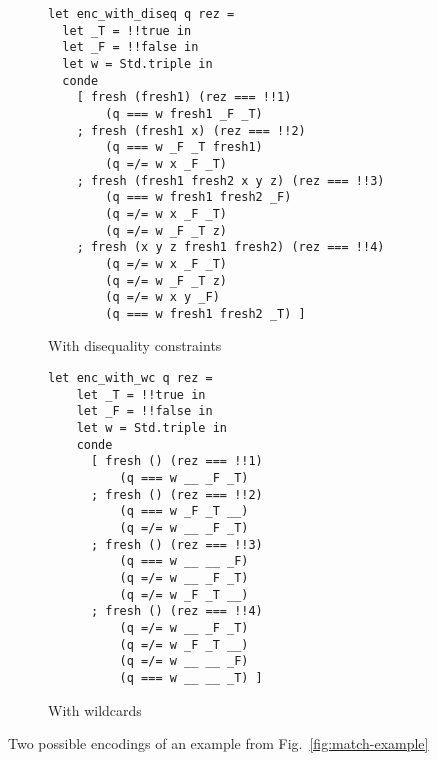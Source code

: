 \begin{figure*}[t]
\begin{subfigure}{0.49\textwidth}
\begin{lstlisting}
let enc_with_diseq q rez =
  let _T = !!true in
  let _F = !!false in
  let w = Std.triple in 
  conde
    [ fresh (fresh1) (rez === !!1) 
        (q === w fresh1 _F _T)
    ; fresh (fresh1 x) (rez === !!2) 
        (q === w _F _T fresh1) 
        (q =/= w x _F _T)
    ; fresh (fresh1 fresh2 x y z) (rez === !!3) 
        (q === w fresh1 fresh2 _F) 
        (q =/= w x _F _T) 
        (q =/= w _F _T z)
    ; fresh (x y z fresh1 fresh2) (rez === !!4)
        (q =/= w x _F _T)
        (q =/= w _F _T z)
        (q =/= w x y _F)
        (q === w fresh1 fresh2 _T) ]
\end{lstlisting}
\caption{With disequality constraints}
\label{fig:matching-example3}
\end{subfigure}
\begin{subfigure}{0.49\textwidth}
\begin{lstlisting}
let enc_with_wc q rez =
    let _T = !!true in
    let _F = !!false in
    let w = Std.triple in
    conde
      [ fresh () (rez === !!1) 
          (q === w __ _F _T)
      ; fresh () (rez === !!2) 
          (q === w _F _T __) 
          (q =/= w __ _F _T)
      ; fresh () (rez === !!3) 
          (q === w __ __ _F) 
          (q =/= w __ _F _T) 
          (q =/= w _F _T __)
      ; fresh () (rez === !!4)
          (q =/= w __ _F _T)
          (q =/= w _F _T __)
          (q =/= w __ __ _F)
          (q === w __ __ _T) ]
\end{lstlisting}
\caption{With wildcards}
\end{subfigure}
\caption{Two possible encodings of an example from Fig.~\ref{fig:match-example}}
\label{fig:maranget-example-compilation}
\end{figure*}

